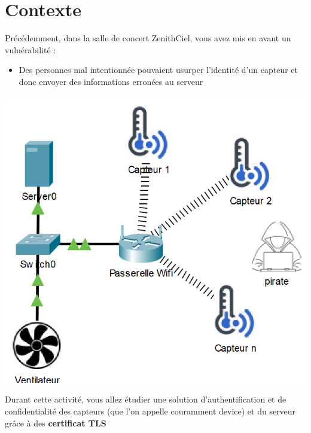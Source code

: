 \documentclass[french, 12pt]{article}%
\newcommand{\itemE}{\item[$\bullet$]}
\begin{document}
\vspace{0.25cm}


\section{Contexte}

Précédemment, dans la salle de concert ZenithCiel, vous avez mis en avant un vulnérabilité : 
\begin{itemize}
\itemE Des personnes mal intentionnée pouvaient usurper l'identité d'un capteur et donc envoyer des informations erronées au serveur
\end{itemize}

\begin{center}
\includegraphics[scale=0.4]{./ressource/topologIeWifiEntreprise.png}
\end{center}

Durant cette activité, vous allez étudier une solution d'authentification et de confidentialité des capteurs (que l'on appelle couramment device) et du serveur grâce à des \textbf{certificat TLS}
\end{document}
